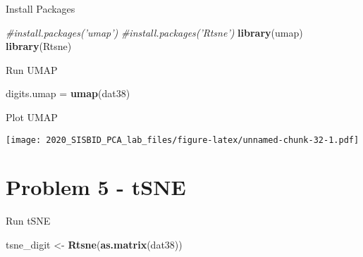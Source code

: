 \documentclass[
]{article}
\newenvironment{Shaded}{\begin{snugshade}}{\end{snugshade}}
\newcommand{\CommentTok}[1]{\textcolor[rgb]{0.56,0.35,0.01}{\textit{#1}}}
\newcommand{\DataTypeTok}[1]{\textcolor[rgb]{0.13,0.29,0.53}{#1}}
\newcommand{\DecValTok}[1]{\textcolor[rgb]{0.00,0.00,0.81}{#1}}
\newcommand{\KeywordTok}[1]{\textcolor[rgb]{0.13,0.29,0.53}{\textbf{#1}}}
\newcommand{\NormalTok}[1]{#1}
\newcommand{\OperatorTok}[1]{\textcolor[rgb]{0.81,0.36,0.00}{\textbf{#1}}}
\newcommand{\StringTok}[1]{\textcolor[rgb]{0.31,0.60,0.02}{#1}}
\begin{document}
Install Packages

\begin{Shaded}
\begin{Highlighting}[]
\CommentTok{#install.packages('umap')}
\CommentTok{#install.packages('Rtsne')}
\KeywordTok{library}\NormalTok{(umap)}
\KeywordTok{library}\NormalTok{(Rtsne)}
\end{Highlighting}
\end{Shaded}

Run UMAP

\begin{Shaded}
\begin{Highlighting}[]
\NormalTok{digits.umap =}\StringTok{ }\KeywordTok{umap}\NormalTok{(dat38)}
\end{Highlighting}
\end{Shaded}

Plot UMAP

\begin{Shaded}
\end{Shaded}

\texttt{[image: 2020\_SISBID\_PCA\_lab\_files/figure-latex/unnamed-chunk-32-1.pdf]}

\hypertarget{problem-5---tsne-1}{%
\section{Problem 5 - tSNE}\label{problem-5---tsne-1}}

Run tSNE

\begin{Shaded}
\begin{Highlighting}[]
\NormalTok{tsne_digit <-}\StringTok{ }\KeywordTok{Rtsne}\NormalTok{(}\KeywordTok{as.matrix}\NormalTok{(dat38))}
\end{Highlighting}
\end{Shaded}
\end{document}
